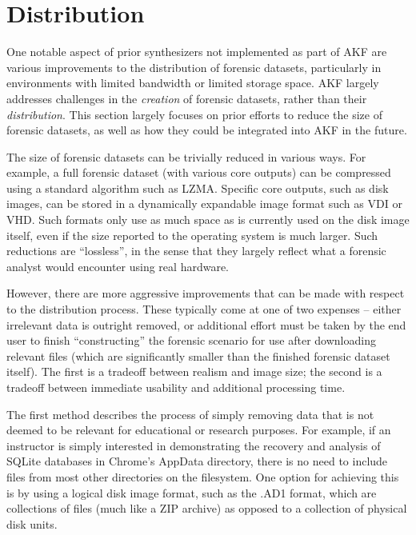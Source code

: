 \section{Distribution}\label{distribution}

One notable aspect of prior synthesizers not implemented as part of AKF
are various improvements to the distribution of forensic datasets,
particularly in environments with limited bandwidth or limited storage
space. AKF largely addresses challenges in the \emph{creation} of
forensic datasets, rather than their \emph{distribution}. This section
largely focuses on prior efforts to reduce the size of forensic
datasets, as well as how they could be integrated into AKF in the
future.

The size of forensic datasets can be trivially reduced in various ways.
For example, a full forensic dataset (with various core outputs) can be
compressed using a standard algorithm such as LZMA. Specific core
outputs, such as disk images, can be stored in a dynamically expandable
image format such as VDI or VHD. Such formats only use as much space as
is currently used on the disk image itself, even if the size reported to
the operating system is much larger. Such reductions are ``lossless'',
in the sense that they largely reflect what a forensic analyst would
encounter using real hardware.

However, there are more aggressive improvements that can be made with
respect to the distribution process. These typically come at one of two
expenses -- either irrelevant data is outright removed, or additional
effort must be taken by the end user to finish ``constructing'' the
forensic scenario for use after downloading relevant files (which are
significantly smaller than the finished forensic dataset itself). The
first is a tradeoff between realism and image size; the second is a
tradeoff between immediate usability and additional processing time.

The first method describes the process of simply removing data that is
not deemed to be relevant for educational or research purposes. For
example, if an instructor is simply interested in demonstrating the
recovery and analysis of SQLite databases in Chrome's AppData directory,
there is no need to include files from most other directories on the
filesystem. One option for achieving this is by using a logical disk
image format, such as the .AD1 format, which are collections of files
(much like a ZIP archive) as opposed to a collection of physical disk
units.

